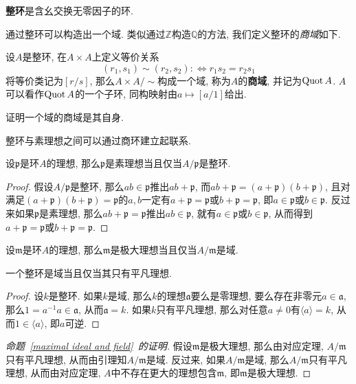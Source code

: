\begin{defn}
    \textbf{整环}是含幺交换无零因子的环.
\end{defn}

通过整环可以构造出一个域.
类似通过$\mathbb{Z}$构造$\mathbb{Q}$的方法, 我们定义整环的\textit{商域}如下.
\begin{defn}
    设$A$是整环, 在$A\times A$上定义等价关系
    \[(r_1,s_1)\sim(r_2,s_2):\iff r_1s_2=r_2s_1\]
    将等价类记为$[r/s]$, 那么$A\times A/\sim$构成一个域, 称为$A$的\textbf{商域}, 并记为$\operatorname{Quot}{A}$.
    $A$可以看作$\operatorname{Quot}{A}$的一个子环, 同构映射由$a\mapsto [a/1]$给出.
\end{defn}

\begin{ex}
    证明一个域的商域是其自身.
\end{ex}

整环与素理想之间可以通过商环建立起联系.
\begin{prop}
    设$\mathfrak{p}$是环$A$的理想, 那么$\mathfrak{p}$是素理想当且仅当$A/\mathfrak{p}$是整环.
\end{prop}
\begin{proof}
    假设$A/\mathfrak{p}$是整环, 那么$ab\in\mathfrak{p}$推出$ab+\mathfrak{p}$, 而$ab+\mathfrak{p}=(a+\mathfrak{p})(b+\mathfrak{p})$, 且对满足$(a+\mathfrak{p})(b+\mathfrak{p})=\mathfrak{p}$的$a,b$一定有$a+\mathfrak{p}=\mathfrak{p}$或$b+\mathfrak{p}=\mathfrak{p}$, 即$a\in\mathfrak{p}$或$b\in\mathfrak{p}$.
    反过来如果$\mathfrak{p}$是素理想, 那么$ab+\mathfrak{p}=\mathfrak{p}$推出$ab\in\mathfrak{p}$, 就有$a\in\mathfrak{p}$或$b\in\mathfrak{p}$, 从而得到$a+\mathfrak{p}=\mathfrak{p}$或$b+\mathfrak{p}=\mathfrak{p}$.
\end{proof}

\begin{prop}\label{maximal ideal and field}
    设$\mathfrak{m}$是环$A$的理想, 那么$\mathfrak{m}$是极大理想当且仅当$A/\mathfrak{m}$是域.
\end{prop}

\begin{lem}
    一个整环是域当且仅当其只有平凡理想.
\end{lem}
\begin{proof}
    设$k$是整环.
    如果$k$是域, 那么$k$的理想$\mathfrak{a}$要么是零理想, 要么存在非零元$a\in\mathfrak{a}$, 那么$1=a^{-1}a\in\mathfrak{a}$, 从而$\mathfrak{a}=k$.
    如果$k$只有平凡理想, 那么对任意$a\neq 0$有$\langle a\rangle=k$, 从而$1\in\langle a\rangle$, 即$a$可逆.
\end{proof}

\begin{proof}[命题~\ref{maximal ideal and field}~的证明]
    假设$\mathfrak{m}$是极大理想, 那么由对应定理, $A/\mathfrak{m}$只有平凡理想, 从而由引理知$A/\mathfrak{m}$是域.
    反过来, 如果$A/\mathfrak{m}$是域, 那么$A/\mathfrak{m}$只有平凡理想, 从而由对应定理, $A$中不存在更大的理想包含$\mathfrak{m}$, 即$\mathfrak{m}$是极大理想.
\end{proof}

